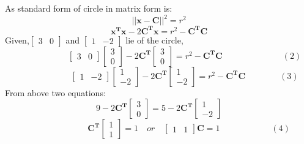 \documentclass{beamer}
\begin{document}
\begin{frame}
As standard form of circle in matrix form is:
\[
||\boldsymbol{x-C}||^2=r^2
\]
\[
\boldsymbol{x^Tx}-2\boldsymbol{C^Tx} = r^2 - \boldsymbol{C^TC}
\]
Given,$\begin{bmatrix}
3 & 0
\end{bmatrix}$
and
$\begin{bmatrix}
1 & -2
\end{bmatrix}$
lie of the circle,
\[
\hspace{6em}
\begin{bmatrix}
3 & 0
\end{bmatrix}
\begin{bmatrix}
3\\
0
\end{bmatrix}
-2\boldsymbol{C^T}
\begin{bmatrix}
3\\
0
\end{bmatrix}
=r^2 - \boldsymbol{C^TC}
\hspace{7em} (2)
\]
\[
\hspace{6em}
\begin{bmatrix}
1 & -2
\end{bmatrix}
\begin{bmatrix}
1\\
-2
\end{bmatrix}
-2\boldsymbol{C^T}
\begin{bmatrix}
1\\
-2
\end{bmatrix}
=r^2 - \boldsymbol{C^TC}
\hspace{4em} (3)
\]
From above two equations:
\[
9-2\boldsymbol{C^T}
\begin{bmatrix}
3\\
0
\end{bmatrix}
=
5 -2\boldsymbol{C^T}
\begin{bmatrix}
1\\
-2
\end{bmatrix}
\]
\[
\hspace{7em}
\boldsymbol{C^T}
\begin{bmatrix}
1\\
1
\end{bmatrix}
 = 1
 \hspace{1em} or 
 \hspace{1em}
 \begin{bmatrix}
1 & 1
\end{bmatrix}
\boldsymbol{C}
 = 1
 \hspace{6em} (4)
\]
\end{frame}
\end{document}
